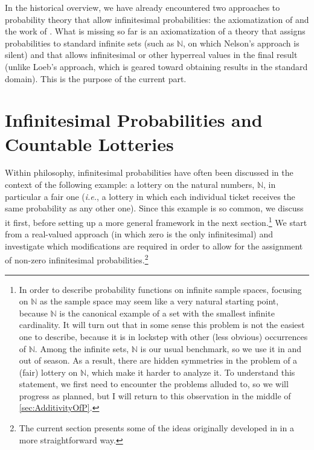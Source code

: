 
\noindent In the historical overview, we have already encountered two approaches to probability theory that allow infinitesimal probabilities: the axiomatization of \citet{Nelson:1987} and the work of \citet{Loeb:1975}. What is missing so far is an axiomatization of a theory that assigns probabilities to standard infinite sets (such as $\mathbb{N}$, on which Nelson's approach is silent) and that allows infinitesimal or other hyperreal values in the final result (unlike Loeb's approach, which is geared toward obtaining results in the standard domain). This is the purpose of the current part.

\section{Infinitesimal Probabilities and Countable Lotteries}\label{sec:natural}
Within philosophy, infinitesimal probabilities have often been discussed in the context of the following example: a lottery on the natural numbers, $\mathbb{N}$, in particular a fair one (\textit{i.e.}, a lottery in which each individual ticket receives the same probability as any other one). Since this example is so common, we discuss it first, before setting up a more general framework in the next section.\footnote{In order to describe probability functions on infinite sample spaces, focusing on $\mathbb{N}$ as the sample space may seem like a very natural starting point, because $\mathbb{N}$ is the canonical example of a set with the smallest infinite cardinality.
It will turn out that in some sense this problem is not the easiest one to describe, because it is in lockstep with other (less obvious) occurrences of $\mathbb{N}$. Among the infinite sets, $\mathbb{N}$ is our usual benchmark, so we use it in and out of season. As a result, there are hidden symmetries in the problem of a (fair) lottery on $\mathbb{N}$, which make it harder to analyze it. To understand this statement, we first need to encounter the problems alluded to, so we will progress as planned, but I will return to this observation in the middle of \autoref{sec:AdditivityOfP}.}
We start from a real-valued approach (in which zero is the only infinitesimal) and investigate which modifications are required in order to allow for the assignment of non-zero infinitesimal probabilities.\footnote{The current section presents some of the ideas originally developed in \citet{WenmackersHorsten:2013} in a more straightforward way.}

